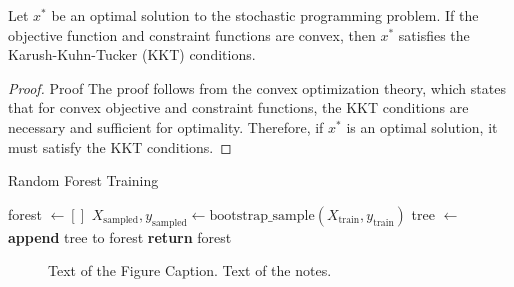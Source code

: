 \documentclass[ijds,sglanonrev]{informs4}
\begin{document}
\begin{theorem}\label{thm:Opt}
Let $x^*$ be an optimal solution to the stochastic programming problem. If the objective function and constraint functions are convex, then $x^*$ satisfies the Karush-Kuhn-Tucker (KKT) conditions.
\end{theorem}

\begin{proof}{Proof}
The proof follows from the convex optimization theory, which states that for convex objective and constraint functions, the KKT conditions are necessary and sufficient for optimality. Therefore, if $x^*$ is an optimal solution, it must satisfy the KKT conditions.\Halmos
\end{proof}

\begin{algorithm}
\caption{Random Forest Training}
\vskip6pt
\begin{algorithmic}
    \State forest $\gets []$
        \State $X_{\text{sampled}}, y_{\text{sampled}} \gets \text{bootstrap\_sample}(X_{\text{train}}, y_{\text{train}})$
        \State tree $\gets$ 
        \State \textbf{append} tree to forest
    \EndFor
    \State \textbf{return} forest
\EndProcedure
\Statex
\end{algorithmic}
\end{algorithm}

 \begin{figure}
     \FIGURE
 {}
{Text of the Figure Caption. \label{fig1}}
{Text of the notes.}
\end{figure}
\end{document}
